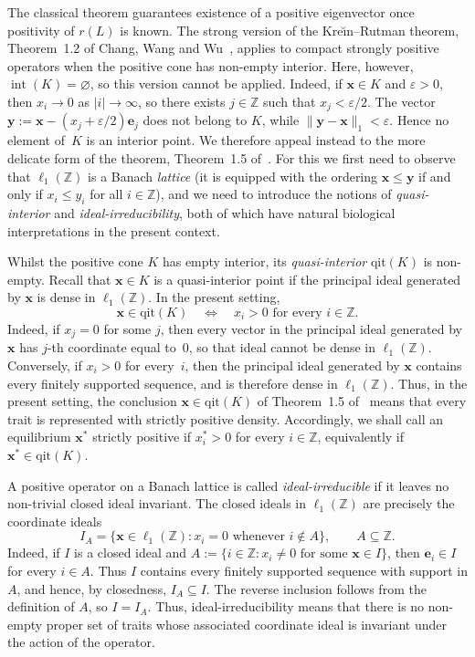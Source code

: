 \documentclass[12pt]{article}
\newcommand{\Z}{\ensuremath{\mathbb Z}}
\newcommand{\by}{\boldsymbol{y}}
\newcommand{\be}{\boldsymbol{e}}
\newcommand{\qit}{\text{qit}}
\newcommand{\BS}{\ensuremath{\ell_1(\Z)}}
\newcommand{\bx}{\boldsymbol{x}}
\begin{document}
The classical theorem guarantees existence of a positive eigenvector
once positivity of $r(L)$ is known. The strong version of the
Kre\u{\i}n--Rutman theorem, Theorem~1.2 of Chang, Wang and
Wu~\cite{CWW20}, applies to compact strongly positive operators when the
positive cone has non-empty interior. Here, however,
$\operatorname{int}(K)=\varnothing$, so this version cannot be applied.
Indeed, if $\bx\in K$ and $\varepsilon>0$, then $x_i\to 0$ as
$|i|\to\infty$, so there exists $j\in\Z$ such that $x_j<\varepsilon/2$.
The vector $\by:=\bx-(x_j+\varepsilon/2)\be_j$ does not belong to $K$,
while $\|\by-\bx\|_1<\varepsilon$. Hence no element of~$K$ is an
interior point. We therefore appeal instead to the more
delicate form of the theorem,
Theorem~1.5 of~\cite{CWW20}. For this we first need to observe that
$\BS$ is a Banach {\em lattice\/} (it is equipped with the
ordering $\bx\leq \by$ if and only if $x_i\leq y_i$ for all $i\in \Z$),
and we need to introduce the notions of {\em quasi-interior\/} and {\em
ideal-irreducibility\/}, both of which have natural biological
interpretations in the present context.

Whilst the positive cone $K$ has empty interior, its
{\em quasi-interior\/} $\qit(K)$ is non-empty. Recall that
$\bx\in K$ is a quasi-interior point if the principal ideal generated
by $\bx$ is dense in $\BS$. In the present setting,
$$
\bx\in\qit(K)
\quad\Longleftrightarrow\quad
x_i>0\text{ for every }i\in\Z.
$$
Indeed, if $x_j=0$ for some $j$, then every vector in the principal
ideal generated by $\bx$ has $j$-th coordinate equal to~$0$, so that ideal
cannot be dense in $\BS$. Conversely, if $x_i>0$ for every~$i$, then
the principal ideal generated by $\bx$ contains every finitely
supported sequence, and is therefore dense in $\BS$.
Thus, in the present setting, the conclusion
$\bx\in\qit(K)$ of Theorem~1.5 of~\cite{CWW20} means that every trait
is represented with strictly positive density. Accordingly, we shall
call an equilibrium $\bx^*$ strictly positive if $x_i^*>0$ for every
$i\in\Z$, equivalently if $\bx^*\in\qit(K)$.

A positive operator on a Banach lattice is called {\em
ideal-irreducible\/} if it leaves no non-trivial closed ideal invariant.
The closed ideals in $\BS$ are precisely the coordinate ideals
$$
 I_A = \{\bx\in\BS:x_i=0\text{ whenever }i\notin A\},
\qquad A\subseteq\Z.
$$
Indeed, if $I$ is a closed ideal and $A:=\{i\in\Z:x_i\neq0\text{ for
some }\bx\in I\}$, then $\be_i\in I$ for every $i\in A$. Thus $I$
contains every finitely supported sequence with support in $A$, and
hence, by closedness, $I_A\subseteq I$. The reverse inclusion follows
from the definition of $A$, so $I=I_A$. Thus, ideal-irreducibility means
that there is no non-empty proper set of traits whose associated
coordinate ideal is invariant under the action of the operator.
\end{document}
